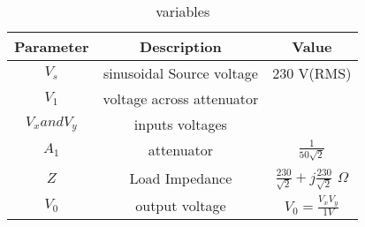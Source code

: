 \begin{table}[h]
  \centering
  \renewcommand{\arraystretch}{1.5}
\begin{tabular}{|c|c|c|}
\hline
Parameter & Description & Value \\\hline
\( V_s \) & sinusoidal Source voltage & 230 V(RMS)\\ \hline
\(V_1 \) & voltage across attenuator &  \\\hline
\( V_x and V_y \) & inputs voltages& \\ \hline
\(A_1\) & attenuator&  $\frac{1}{50\sqrt{2}}$ \\ \hline
\(Z\) & Load Impedance& $\frac{230}{\sqrt{2}}+j\frac{230}{\sqrt{2}}$ $\Omega$ \\ \hline
\(V_0\) & output voltage & $V_0=\frac{V_xV_y}{1V} $\\ \hline
\end{tabular}
\caption{variables}
  \label{tab:xn}
\end{table}